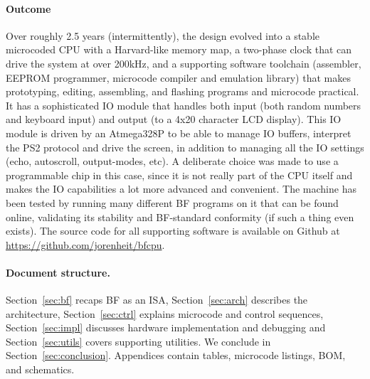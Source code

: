 \paragraph{Outcome}
Over roughly 2.5 years (intermittently), the design evolved into a stable microcoded CPU with a Harvard-like memory map, a two-phase clock that can drive the system at over 200kHz, and a supporting software toolchain (assembler, EEPROM programmer, microcode compiler and emulation library) that makes prototyping, editing, assembling, and flashing programs and microcode practical. It has a sophisticated IO module that handles both input (both random numbers and keyboard input) and output (to a 4x20 character LCD display). This IO module is driven by an Atmega328P to be able to manage IO buffers, interpret the PS2 protocol and drive the screen, in addition to managing all the IO settings (echo, autoscroll, output-modes, etc). A deliberate choice was made to use a programmable chip in this case, since it is not really part of the CPU itself and makes the IO capabilities a lot more advanced and convenient. The machine has been tested by running many different BF programs on it that can be found online, validating its stability and BF-standard conformity (if such a thing even exists). The source code for all supporting software is available on Github at \url{https://github.com/jorenheit/bfcpu}.

\paragraph{Document structure.}
  Section~\ref{sec:bf} recaps BF as an ISA, Section~\ref{sec:arch} describes the architecture, Section~\ref{sec:ctrl} explains microcode and control sequences, Section~\ref{sec:impl} discusses hardware implementation and debugging and Section~\ref{sec:utils} covers supporting utilities. We conclude in Section~\ref{sec:conclusion}. Appendices contain tables, microcode listings, BOM, and schematics.
